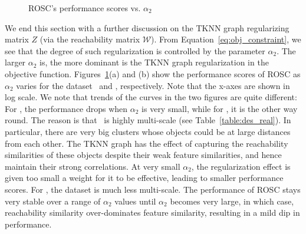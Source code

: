 \begin{figure}[!htbp]
     \vspace{-2mm}
    \caption{ROSC's performance scores vs. $\alpha_2$}
        \label{figure:lambda2}
        \vspace{-3mm}
\end{figure}


We end this section with a further discussion on the TKNN graph regularizing 
matrix $Z$ (via the reachability matrix $\mathcal{W}$).
From Equation~\ref{eq:obj_constraint}, we see that the degree of such regularization is 
controlled by the parameter $\alpha_2$. 
The larger $\alpha_2$ is, the more dominant is the TKNN graph regularization in
the objective function. 
Figures~\ref{figure:lambda2}(a) and (b) show the performance scores of ROSC 
as $\alpha_2$ varies for the dataset \coil\ and \glass, respectively. 
Note that the x-axes are shown in log scale. 
We note that trends of the curves in the two figures are quite different:
For \coil, the performance drops when $\alpha_2$ is very small, while for \glass, it is the other way
round.
The reason is that \coil\ is highly multi-scale (see Table~\ref{table:des_real}).
In particular, there are very big clusters whose objects could be at large distances from each other.
The TKNN graph has the effect of capturing the reachability similarities of these objects despite
their weak feature similarities, and hence maintain their strong correlations. 
At very small $\alpha_2$, the regularization effect is given too small a weight for it to
be effective, leading to smaller performance scores. 
For \glass, the dataset is much less multi-scale. 
The performance of ROSC stays very stable over a range of $\alpha_2$ values
until $\alpha_2$ becomes very large, in which case, reachability similarity
over-dominates  feature similarity, resulting in a mild dip in performance.

